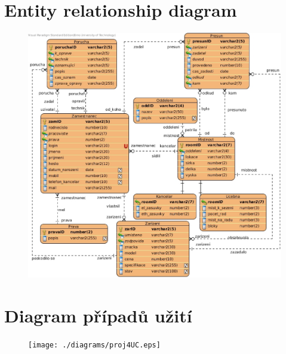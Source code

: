 \documentclass[11pt,a4paper,onecolumn]{article}
\begin{document}
\section{Entity relationship diagram}
\begin{figure}[H]
\begin{centering}
\includegraphics[scale=0.63]{./diagrams/proj4ERD.eps}
\end{centering}
\end{figure}
\newpage
\section{Diagram případů užití}
\begin{figure}[H]
\begin{centering}
\texttt{[image: ./diagrams/proj4UC.eps]}
\end{centering}
\end{figure}
\end{document}
